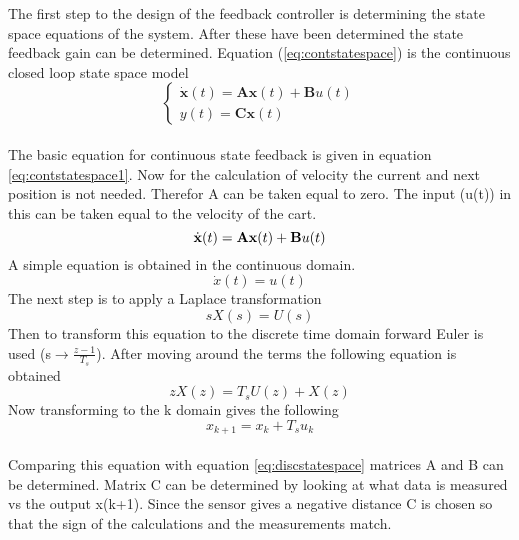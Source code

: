 The first step to the design of the feedback controller is determining the state space equations of the system. After these have been determined the state feedback gain can be determined. Equation (\ref{eq:contstatespace}) is the continuous closed loop state space model\\
 \begin{equation}
    \begin{cases}
    \dot{\textbf{x}}(t) = \textbf{Ax}(t) + \textbf{B}u(t)\\
    y(t) = \textbf{Cx}(t)
    \end{cases}
    \label{eq:contstatespace}
\end{equation}
\\
The basic equation for continuous state feedback is given in equation \ref{eq:contstatespace1}. Now for the calculation of velocity the current and next position is not needed. Therefor A can be taken equal to zero. The input (u(t)) in this can be taken equal to the velocity of the cart.
\begin{equation}
    \dot{\textbf{x}}(t) = \textbf{Ax}(t) + \textbf{B}u(t) \\
    \label{eq:contstatespace1}
\end{equation}
A simple equation is obtained in the continuous domain. 
\begin{equation}
    \dot{x}(t) = u(t)
\end{equation}
The next step is to apply a Laplace transformation 
\begin{equation}
    sX(s) = U(s)
\end{equation}
Then to transform this equation to the discrete time domain forward Euler is used (s$\rightarrow\frac{z\minus1}{T_{s}}$). After moving around the terms the following equation is obtained
\begin{equation}
    zX(z) = T_{s}U(z) + X(z)
\end{equation}
Now transforming to the k domain gives the following
\begin{equation}
    x_{k+1} = x_{k} + T_{s}u_{k}
\end{equation}
\\
Comparing this equation with equation \ref{eq:discstatespace} matrices A and B can be determined. Matrix C can be determined by looking at what data is measured vs the output x(k+1). Since the sensor gives a negative distance C is chosen so that the sign of the calculations and the measurements match.\\

